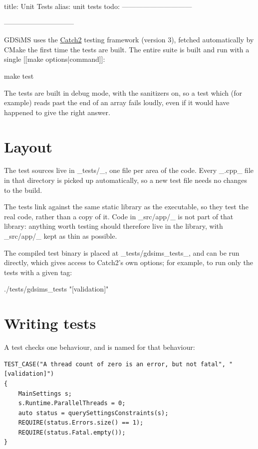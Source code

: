 title: Unit Tests
alias: unit tests
todo:
------------------------------
\usepackage{listings}
------------------------------

GDSiMS uses the \href{https://github.com/catchorg/Catch2}{Catch2} testing framework (version 3), fetched automatically by CMake the first time the tests are built. The entire suite is built and run with a single [[make options|command]]:

\begin{Code}
	make test
\end{Code}

The tests are built in debug mode, with the sanitizers on, so a test which (for example) reads past the end of an array fails loudly, even if it would have happened to give the right answer.

\section{Layout}

	The test sources live in _tests/_, one file per area of the code. Every _.cpp_ file in that directory is picked up automatically, so a new test file needs no changes to the build.

	The tests link against the same static library as the executable, so they test the real code, rather than a copy of it. Code in _src/app/_ is not part of that library: anything worth testing should therefore live in the library, with _src/app/_ kept as thin as possible.

	The compiled test binary is placed at _tests/gdsims\_tests_, and can be run directly, which gives access to Catch2's own options; for example, to run only the tests with a given tag:

	\begin{Code}
		./tests/gdsims\_tests "[validation]"
	\end{Code}

\section{Writing tests}

	A test checks one behaviour, and is named for that behaviour:

	\begin{lstlisting}
TEST_CASE("A thread count of zero is an error, but not fatal", "[validation]")
{
	MainSettings s;
	s.Runtime.ParallelThreads = 0;
	auto status = querySettingsConstraints(s);
	REQUIRE(status.Errors.size() == 1);
	REQUIRE(status.Fatal.empty());
}
\end{lstlisting}

